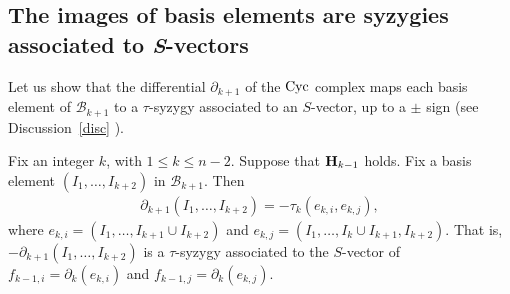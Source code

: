 \documentclass[ALCO]{cedram}
\newcommand{\mcb}{\mbox{$\mathcal{B}$}}
\newcommand{\mbfh}{\mbox{${\bf H}$}}
\newcommand{\dif}{\mbox{$\partial$}}
\newcommand{\cyc}{\mbox{${\rm Cyc}$}}
\begin{document}
\subsection{The images  of basis elements 
are syzygies associated to {\em S}-vectors} %

 Let us show that the differential $\dif_{k+1}$ of the $\cyc$
complex maps each basis element of $\mcb_{k+1}$ to a $\tau$-syzygy
associated to an $S$-vector, up to a $\pm$ sign (see
Discussion~\ref{disc} ).

\begin{proposition}\label{tau}
Fix an integer $k$, with $1\leq k\leq n-2$. Suppose that $\mbfh_{k-1}$
holds. Fix a basis element $(I_1,\ldots ,I_{k+2})$ in $\mcb_{k+1}$.
Then
\begin{eqnarray*}
\dif_{k+1}(I_1,\ldots,I_{k+2})=-\tau_{k}(e_{k,i},e_{k,j}),
\end{eqnarray*}
where $e_{k,i}=(I_1,\ldots ,I_{k+1}\cup I_{k+2})$ and
$e_{k,j}=(I_1,\ldots,I_{k}\cup I_{k+1},I_{k+2})$. That is,
$-\dif_{k+1}(I_1,\ldots,I_{k+2})$ is a $\tau$-syzygy associated to the
$S$-vector of $f_{k-1,i}=\dif_{k}(e_{k,i})$ and
$f_{k-1,j}=\dif_{k}(e_{k,j})$.
\end{proposition}
\end{document}
